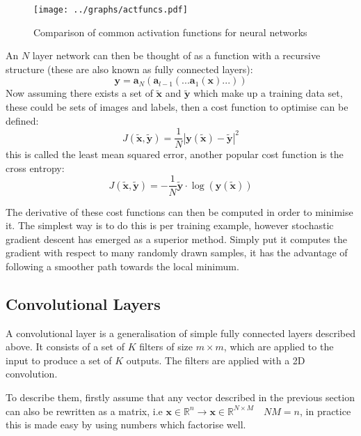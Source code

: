   \begin{figure} \label{disfagraph}
    \center
    \texttt{[image: ../graphs/actfuncs.pdf]}
    \caption{Comparison of common activation functions for neural networks}
  \end{figure}



  An $N$ layer network can
  then be thought of as a function with a recursive structure (these are also known as fully connected layers):
  \begin{equation}
    \mathbf{y} = \mathbf{a}_{N}(\mathbf{a}_{l-1}(...\mathbf{a}_1(\mathbf{x})...))
  \end{equation}
  Now assuming there exists a set of $\tilde{\mathbf{x}}$ and $\tilde{\mathbf{y}}$ which make
  up a training data set, these could be sets of images and labels, then a cost function
  to optimise can be defined:
  \begin{equation}
    J(\tilde{\mathbf{x}},\tilde{\mathbf{y}}) = \frac{1}{N}\left |\mathbf{y}(\tilde{\mathbf{x}})-\tilde{\mathbf{y}}\right | ^2
  \end{equation}
  this is called the least mean squared error, another popular cost function is
  the cross entropy:
  \begin{equation}
    J(\tilde{\mathbf{x}},\tilde{\mathbf{y}}) = -\frac{1}{N}\tilde{\mathbf{y}}\cdot\log(\mathbf{y}(\tilde{\mathbf{x}}))
  \end{equation}

  The derivative of these cost functions can then be computed in order to minimise it.
  The simplest way is to do this is per training example, however stochastic gradient
  descent\cite{Amari1993} has emerged as a superior method. Simply put it computes the gradient with respect
  to many randomly drawn samples, it has the advantage of following a smoother path
  towards the local minimum.
  \subsection{Convolutional Layers}
  A convolutional layer is a generalisation of simple fully connected layers described
  above. It consists of a set of $K$ filters of size $m\times m$, which are applied to the input to produce
  a set of $K$ outputs. The filters are applied with a 2D convolution.


  To describe them, firstly assume that any vector described in the previous section
  can also be rewritten as a matrix, i.e $\mathbf{x} \in \mathbb{R}^{n}
  \rightarrow \mathbf{x} \in \mathbb{R}^{N \times M} \quad NM=n$, in practice this is made
  easy by using numbers which factorise well.

